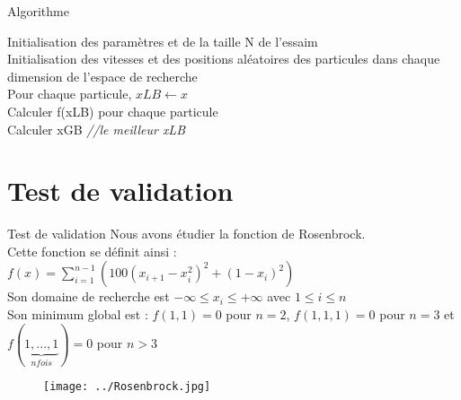 \documentclass{beamer}
\begin{document}
  \begin{frame}{Algorithme}
    \scriptsize
    \begin{algorithm}[H]
      \SetAlgoLined
      Initialisation des paramètres et de la taille N de l'essaim \\
      Initialisation des vitesses et des positions aléatoires des particules dans chaque dimension de l'espace de recherche \\
      Pour chaque particule, $xLB\gets x$ \\
      Calculer f(xLB) pour chaque particule \\
      Calculer xGB \emph{//le meilleur xLB} \\
    \end{algorithm}
  \end{frame}

\section{Test de validation}
  \begin{frame}{Test de validation}
    Nous avons étudier la fonction de Rosenbrock. \\
    Cette fonction se définit ainsi : \\
    $f(x) = \sum_{i=1}^{n-1}(100(x_{i+1}-x_i^2)^2 + (1-x_i)^2)$ \\
    Son domaine de recherche est $-\infty \le x_i \le +\infty$ avec $1 \le i \le n$ \\
    Son minimum global est : $f(1,1) = 0$ pour $n = 2$, $f(1,1,1) = 0$ pour $n = 3$ et $f(\underbrace{1,...,1}_{n fois}) = 0$ pour $n > 3$
    \begin{figure}
      \begin{center}
        \texttt{[image: ../Rosenbrock.jpg]} 
      \end{center}
    \end{figure}
  \end{frame}
\end{document}
